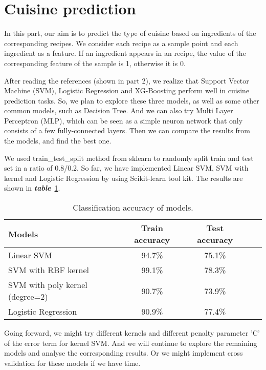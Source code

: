 \documentclass{article}
\begin{document}
\section{Cuisine prediction}
In this part, our aim is to predict the type of cuisine based on ingredients of the corresponding recipes. We consider each recipe as a sample point and each ingredient as a feature. If an ingredient appears in an recipe, the value of the corresponding feature of the sample is 1, otherwise it is 0.

After reading the references (shown in part 2), we realize that Support Vector Machine (SVM), Logistic Regression and XG-Boosting perform well in cuisine prediction tasks. So, we plan to explore these three models, as well as some other common models, such as Decision Tree. And we can also try Multi Layer Perceptron (MLP), which can be seen as a simple neuron network that only consists of a few fully-connected layers. Then we can compare the results from the models, and find the best one.

We used train\_test\_split method from sklearn to randomly split train and test set in a ratio of 0.8/0.2. So far, we have implemented Linear SVM, SVM with kernel and Logistic Regression by using Scikit-learn tool kit. The results are shown in \emph{\textbf{table}}~\ref{acc}. 


\begin{table}[htb]
\vskip 2mm
\begin{center}
\begin{tabular}{lcccc}
\hline
Models & Train accuracy & Test accuracy \\
\hline
Linear SVM &  94.7\% & 75.1\% \\
SVM with RBF kernel & 99.1\% & 78.3\% \\
SVM with poly kernel (degree=2) & 90.7\% & 73.9\% \\
Logistic Regression & 90.9\% & 77.4\% \\
\hline
\end{tabular}
\vskip 3mm
\caption{Classification accuracy of models.}
\label{acc}
\end{center}
\end{table}

Going forward, we might try different kernels and different penalty parameter 'C' of the error term for kernel SVM. And we will continue to explore the remaining models and analyse the corresponding results. Or we might implement cross validation for these models if we have time. 
\end{document}
